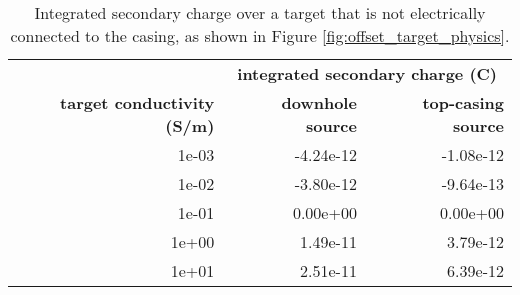 \begin{table}
\centering
    \begin{tabular}[htb]{| r | r | r |}
        \hline
                                           & \multicolumn{2}{|c|}{\textbf{integrated secondary charge (C)}} \\
        \textbf{target conductivity (S/m)} & \textbf{downhole source} & \textbf{top-casing source} \\
        \hline
        1e-03 & -4.24e-12 & -1.08e-12 \\
        1e-02 & -3.80e-12 & -9.64e-13 \\
        1e-01 & 0.00e+00 & 0.00e+00 \\
        1e+00 & 1.49e-11 & 3.79e-12 \\
        1e+01 & 2.51e-11 & 6.39e-12 \\
        \hline
    \end{tabular}
    \caption{Integrated secondary charge over a target that is not electrically connected to the casing, as shown in Figure \ref{fig:offset_target_physics}.}
    \label{tab:offset_charge}
 \end{table}



